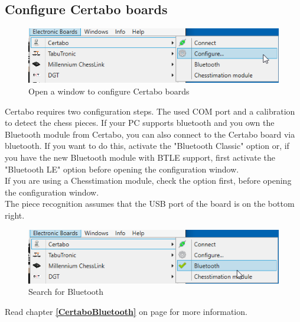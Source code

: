 \documentclass[11pt,a4paper]{article}
\begin{document}
\subsection{Configure Certabo boards} \label{ConfigureCertabo}
\begin{figure}[H]
	\centering
	\includegraphics[scale=0.9]{Certabo1.png}
	\caption{Open a window to configure Certabo boards }
	\label{fig:Certabo1}
\end{figure}

Certabo requires two configuration steps. The used COM port and a calibration to detect the chess pieces. If your PC supports bluetooth and you own the Bluetooth module from Certabo, you can also connect to the Certabo board via bluetooth. If you want to do this, activate the "Bluetooth Classic" option or, if you have the new Bluetooth module with BTLE support, first activate the "Bluetooth LE" option before opening the configuration window.\\
If you are using a Chesstimation module, check the option first, before opening the configuration window.\\
The piece recognition assumes that the USB port of the board is on the bottom right.

\begin{figure}[H]
	\centering
	\includegraphics[scale=0.9]{Certabo6.png}
	\caption{Search for Bluetooth }
	\label{fig:Certabo6}
\end{figure}

Read chapter \textbf{\ref{CertaboBluetooth}  } on page \pageref{CertaboBluetooth} for more information.
\end{document}
